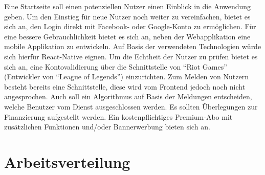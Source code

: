 Eine Startseite soll einen potenziellen Nutzer einen Einblick in die Anwendung geben.
Um den Einstieg für neue Nutzer noch weiter zu vereinfachen, bietet es sich an, den Login direkt mit Facebook- oder Google-Konto zu ermöglichen.
Für eine bessere Gebrauchlichkeit %
bietet es sich an, neben der Webapplikation eine mobile Applikation zu entwickeln.
Auf Basis der verwendeten Technologien würde sich hierfür React-Native eignen.
Um die Echtheit der Nutzer zu prüfen bietet es sich an, eine Kontovalidierung über die Schnittstelle von \enquote{Riot Games} (Entwickler von \enquote{League of Legends}) einzurichten.
Zum Melden von Nutzern besteht bereits eine Schnittstelle, diese wird vom Frontend jedoch noch nicht angesprochen.
Auch soll ein Algorithmus auf Basis der Meldungen entscheiden, welche Benutzer vom Dienst ausgeschlossen werden.
Es sollten Überlegungen zur Finanzierung aufgestellt werden.
Ein kostenpflichtiges Premium-Abo mit zusätzlichen Funktionen und/oder Bannerwerbung bieten sich an.

\section{Arbeitsverteilung}

